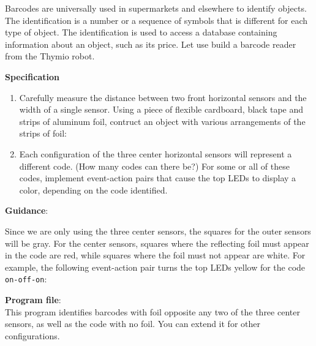 
\label{ch.barcode}

Barcodes are universally used in supermarkets and elsewhere to identify
objects. The identification is a number or a sequence of symbols that is
different for each type of object. The identification is used to access
a database containing information about an object, such as its price.
Let use build a barcode reader from the Thymio robot.

\textbf{Specification}

\begin{enumerate}
\item Carefully measure the distance between two front horizontal
sensors and the width of a single sensor.
Using a piece of flexible cardboard, black tape and strips of aluminum
foil, contruct an object with various arrangements of the strips of foil:

\begin{center}
\end{center}

\item Each configuration of the three center horizontal sensors will
represent a different code. (How many codes can there be?) For some or
all of these codes, implement event-action pairs that cause the top LEDs
to display a color, depending on the code identified.

\end{enumerate}

\textbf{Guidance}:

Since we are only using the three center sensors, the squares for the
outer sensors will be gray. For the center sensors, squares where the
reflecting foil must appear in the code are red, while squares where the
foil must not appear are white. For example, the following event-action
pair turns the top LEDs yellow for the code \texttt{on-off-on}:


\bigskip

\textbf{Program file}: \\
This program identifies barcodes with foil opposite any two of the three
center sensors, as well as the code with no foil. You can extend it for
other configurations. 

